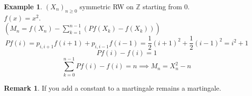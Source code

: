 \documentclass[10pt,a4paper]{article}
\theoremstyle{definition}
\newtheorem{exi}{Example}[section]
\newtheorem*{rem}{Remark}
\begin{document}
\begin{exi}
	$(X_n)_{n\geq0}$ symmetric RW on $\mathbb{Z}$ starting from $0$.\\
	$f(x)=x^2$.\\
	$\left(M_n=f(X_n)-\sum_{k=1}^{n-1}\left(Pf(X_k)-f(X_k)\right)\right)$
	\begin{equation*}
		Pf(i)=p_{i,i+1}f(i+1)+p_{i,i-1}f(i-1)=\frac{1}{2}(i+1)^2+\frac{1}{2}(i-1)^2=i^2+1
	\end{equation*}
\begin{equation*}
	Pf(i)-f(i)=1
\end{equation*}
\begin{equation*}
	\sum_{k=0}^{n-1}Pf(i)-f(i)=n \implies M_n=X_n^2-n
\end{equation*}
\end{exi}
\begin{rem}
	If you add a constant to a martingale remains a martingale.
\end{rem}
\end{document}
